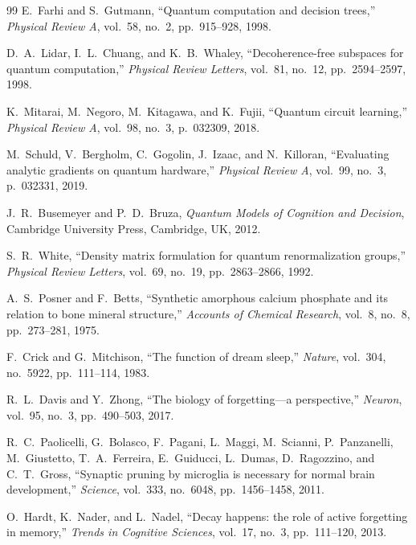 \documentclass[10pt,twocolumn,3p]{article}
\begin{document}
\begin{thebibliography}{99}
E.~Farhi and S.~Gutmann,
``Quantum computation and decision trees,''
\textit{Physical Review A}, vol.~58, no.~2, pp.~915--928, 1998.

D.~A.~Lidar, I.~L.~Chuang, and K.~B.~Whaley,
``Decoherence-free subspaces for quantum computation,''
\textit{Physical Review Letters}, vol.~81, no.~12, pp.~2594--2597, 1998.

K.~Mitarai, M.~Negoro, M.~Kitagawa, and K.~Fujii,
``Quantum circuit learning,''
\textit{Physical Review A}, vol.~98, no.~3, p.~032309, 2018.

M.~Schuld, V.~Bergholm, C.~Gogolin, J.~Izaac, and N.~Killoran,
``Evaluating analytic gradients on quantum hardware,''
\textit{Physical Review A}, vol.~99, no.~3, p.~032331, 2019.

J.~R.~Busemeyer and P.~D.~Bruza,
\textit{Quantum Models of Cognition and Decision},
Cambridge University Press, Cambridge, UK, 2012.

S.~R.~White,
``Density matrix formulation for quantum renormalization groups,''
\textit{Physical Review Letters}, vol.~69, no.~19, pp.~2863--2866, 1992.

A.~S.~Posner and F.~Betts,
``Synthetic amorphous calcium phosphate and its relation to bone mineral structure,''
\textit{Accounts of Chemical Research}, vol.~8, no.~8, pp.~273--281, 1975.

F.~Crick and G.~Mitchison,
``The function of dream sleep,''
\textit{Nature}, vol.~304, no.~5922, pp.~111--114, 1983.

R.~L.~Davis and Y.~Zhong,
``The biology of forgetting---a perspective,''
\textit{Neuron}, vol.~95, no.~3, pp.~490--503, 2017.

R.~C.~Paolicelli, G.~Bolasco, F.~Pagani, L.~Maggi, M.~Scianni, P.~Panzanelli, M.~Giustetto, T.~A.~Ferreira, E.~Guiducci, L.~Dumas, D.~Ragozzino, and C.~T.~Gross,
``Synaptic pruning by microglia is necessary for normal brain development,''
\textit{Science}, vol.~333, no.~6048, pp.~1456--1458, 2011.

O.~Hardt, K.~Nader, and L.~Nadel,
``Decay happens: the role of active forgetting in memory,''
\textit{Trends in Cognitive Sciences}, vol.~17, no.~3, pp.~111--120, 2013.

\end{thebibliography}
\end{document}
